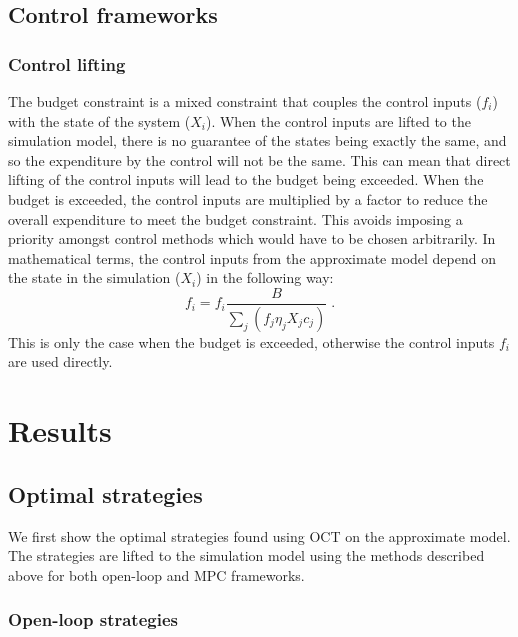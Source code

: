 \subsection{Control frameworks}


\subsubsection{Control lifting}

The budget constraint is a mixed constraint that couples the control inputs ($f_i$) with the state of the system ($X_i$). When the control inputs are lifted to the simulation model, there is no guarantee of the states being exactly the same, and so the expenditure by the control will not be the same. This can mean that direct lifting of the control inputs will lead to the budget being exceeded. When the budget is exceeded, the control inputs are multiplied by a factor to reduce the overall expenditure to meet the budget constraint. This avoids imposing a priority amongst control methods which would have to be chosen arbitrarily. In mathematical terms, the control inputs from the approximate model depend on the state in the simulation ($X_i$) in the following way:
\begin{equation}
    f_i = f_i\frac{B}{\sum_j\left(f_j\eta_jX_jc_j\right)}\;.
\end{equation}
This is only the case when the budget is exceeded, otherwise the control inputs $f_i$ are used directly.

\section{Results\label{sec:ch5:results}}

\subsection{Optimal strategies}

We first show the optimal strategies found using OCT on the approximate model. The strategies are lifted to the simulation model using the methods described above for both open-loop and MPC frameworks.

\subsubsection{Open-loop strategies}

